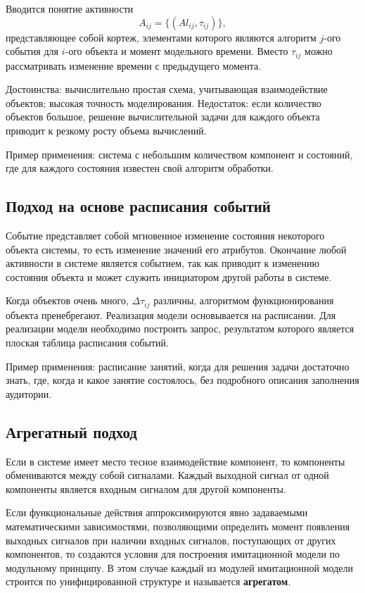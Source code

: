 Вводится понятие активности
\[
  A_{ij} = \bigl\{(Al_{ij}, \tau_{ij})\bigr\},
\]
представляющее собой кортеж, элементами которого являются алгоритм
$j$-ого события для $i$-ого объекта и момент модельного времени. Вместо
$\tau_{ij}$ можно рассматривать изменение времени с предыдущего момента.

Достоинства: вычислительно простая схема, учитывающая взаимодействие
объектов; высокая точность моделирования. Недостаток: если количество
объектов большое, решение вычислительной задачи для каждого объекта
приводит к резкому росту объема вычислений.

Пример применения: система с небольшим количеством компонент и состояний,
где для каждого состояния известен свой алгоритм обработки.

\subsection*{Подход на основе расписания событий}

Событие представляет собой мгновенное изменение состояния некоторого
объекта системы, то есть изменение значений его атрибутов. Окончание любой
активности в системе является событием, так как приводит к изменению
состояния объекта и может служить инициатором другой работы в системе.

Когда объектов очень много, $\Delta\tau_{ij}$ различны, алгоритмом
функционирования объекта пренебрегают. Реализация модели основывается на
расписании. Для реализации модели необходимо построить запрос, результатом
которого является плоская таблица расписания событий.

Пример применения: расписание занятий, когда для решения задачи достаточно
знать, где, когда и какое занятие состоялось, без подробного описания
заполнения аудитории.

\subsection*{Агрегатный подход}

Если в системе имеет место тесное взаимодействие компонент, то компоненты
обмениваются между собой сигналами. Каждый выходной сигнал от одной
компоненты является входным сигналом для другой компоненты.

Если функциональные действия аппроксимируются явно задаваемыми
математическими зависимостями, позволяющими определить момент появления
выходных сигналов при наличии входных сигналов, поступающих от других
компонентов, то создаются условия для построения имитационной модели по
модульному принципу. В этом случае каждый из модулей имитационной модели
строится по унифицированной структуре и называется \textbf{агрегатом}.

